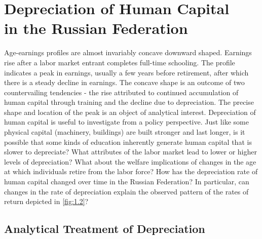 \documentclass[12pt,a4paper]{article}
\numberwithin{equation}{section}
\begin{document}

\section{Depreciation of Human Capital \\ in the Russian Federation}

Age-earnings profiles are almost invariably concave downward shaped. Earnings rise after a labor market entrant completes full-time schooling. The profile indicates a peak in earnings, usually a few years before retirement, after which there is a steady decline in earnings. The concave shape is an outcome of two countervailing tendencies - the rise attributed to continued accumulation of human capital through training and the decline due to depreciation. The precise shape and location of the peak is an object of analytical interest. Depreciation of human capital is useful to investigate from a policy perspective. Just like some physical capital (machinery, buildings) are built stronger and last longer, is it possible that some kinds of education inherently generate human capital that is slower to depreciate? What attributes of the labor market lead to lower or higher levels of depreciation? What about the welfare implications of changes in the age at which individuals retire from the labor force? How has the depreciation rate of human capital changed over time in the Russian Federation? In particular, can changes in the rate of depreciation explain the observed pattern of the rates of return depicted in \ref{fig:1.2}?  

\subsection{Analytical Treatment of Depreciation} 
\end{document}
